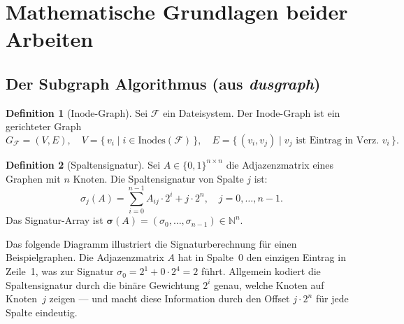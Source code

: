 ﻿\documentclass[a4paper,12pt]{article}
\theoremstyle{definition}
\newtheorem{definition}{Definition}[section]
\theoremstyle{plain}
\begin{document}
\section{Mathematische Grundlagen beider Arbeiten}
\label{sec:grundlagen}

\subsection{Der Subgraph Algorithmus (aus \texorpdfstring{\textit{dusgraph}}{dusgraph})}
\label{ssec:subgraph_algo}

\begin{definition}[Inode-Graph]
\label{def:inode_graph}
  Sei $\mathcal{F}$ ein Dateisystem.  Der Inode-Graph ist ein gerichteter
  Graph
  \[
    G_\mathcal{F} = (V, E),
    \quad
    V = \{\,v_i \mid i \in \mathrm{Inodes}(\mathcal{F})\,\},
    \quad
    E = \{\,(v_i, v_j) \mid v_j \text{ ist Eintrag in Verz. } v_i\,\}.
  \]
\end{definition}

\begin{definition}[Spaltensignatur]
\label{def:spalten_sig}
  Sei $A \in \{0,1\}^{n \times n}$ die Adjazenzmatrix eines Graphen
  mit $n$ Knoten.  Die Spaltensignatur von Spalte $j$ ist:
  \[
    \sigma_j(A) = \sum_{i=0}^{n-1} A_{ij} \cdot 2^i + j \cdot 2^n,
    \quad j = 0, \ldots, n-1.
  \]
  Das Signatur-Array ist $\boldsymbol{\sigma}(A) = (\sigma_0, \ldots,
  \sigma_{n-1}) \in \mathbb{N}^n$.
\end{definition}

Das folgende Diagramm illustriert die Signaturberechnung für einen
Beispielgraphen.  Die Adjazenzmatrix $A$ hat in Spalte~0 den einzigen
Eintrag in Zeile~1, was zur Signatur $\sigma_0 = 2^1 + 0 \cdot 2^4 = 2$
führt.  Allgemein kodiert die Spaltensignatur durch die binäre Gewichtung
$2^i$ genau, welche Knoten auf Knoten~$j$ zeigen --- und macht diese
Information durch den Offset $j \cdot 2^n$ für jede Spalte eindeutig.
\end{document}
